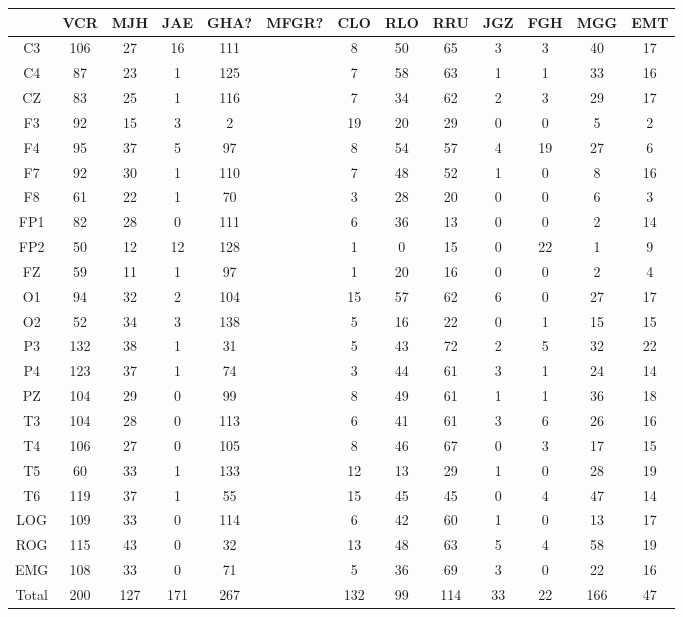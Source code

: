 \begin{SidewaysFigure}
\centering
\begin{tabular}{c|ccccc|cccc|ccc}
& VCR & MJH & JAE & GHA? & MFGR?
& CLO & RLO & RRU & JGZ
& FGH & MGG & EMT \\
\hline
C3 &106&27&16&111&&8&50&65&3&3&40&17 \\
C4 &87&23&1&125&&7&58&63&1&1&33&16 \\
CZ &83&25&1&116&&7&34&62&2&3&29&17 \\
F3 &92&15&3&2&&19&20&29&0&0&5&2 \\
F4 &95&37&5&97&&8&54&57&4&19&27&6 \\
F7 &92&30&1&110&&7&48&52&1&0&8&16 \\
F8 &61&22&1&70&&3&28&20&0&0&6&3 \\
FP1 &82&28&0&111&&6&36&13&0&0&2&14 \\
FP2 &50&12&12&128&&1&0&15&0&22&1&9 \\
FZ &59&11&1&97&&1&20&16&0&0&2&4 \\
O1 &94&32&2&104&&15&57&62&6&0&27&17 \\
O2 &52&34&3&138&&5&16&22&0&1&15&15 \\
P3 &132&38&1&31&&5&43&72&2&5&32&22 \\
P4 &123&37&1&74&&3&44&61&3&1&24&14 \\
PZ &104&29&0&99&&8&49&61&1&1&36&18 \\
T3 &104&28&0&113&&6&41&61&3&6&26&16 \\
T4 &106&27&0&105&&8&46&67&0&3&17&15 \\
T5 &60&33&1&133&&12&13&29&1&0&28&19 \\
T6 &119&37&1&55&&15&45&45&0&4&47&14 \\
LOG &109&33&0&114&&6&42&60&1&0&13&17 \\
ROG &115&43&0&32&&13&48&63&5&4&58&19 \\
EMG &108&33&0&71&&5&36&69&3&0&22&16 \\
\hline
Total&200&127&171&267&&132&99&114&33&22&166&47
\end{tabular}
\caption{Total de \'epocas PE registradas
(todas las fases) para cada
canal. 
}
\label{total_gpos_total}
\end{SidewaysFigure}






